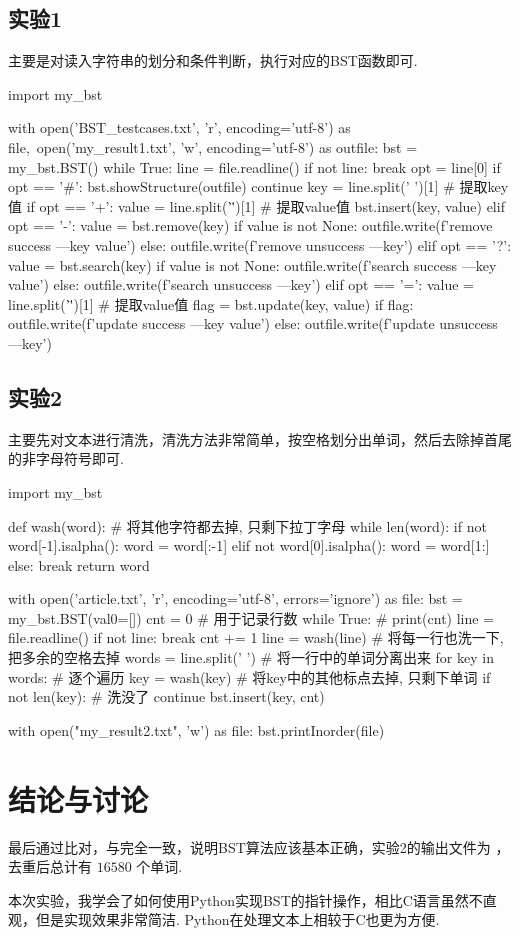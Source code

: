 \documentclass[12pt, a4paper, oneside]{ctexart}
\numberwithin{equation}{section}  %
\begin{document}
\subsection{实验1}
主要是对读入字符串的划分和条件判断，执行对应的BST函数即可.
\begin{pythoncode}
import my_bst

with open('BST_testcases.txt', 'r', encoding='utf-8') as file,\
        open('my_result1.txt', 'w', encoding='utf-8') as outfile:
    bst = my_bst.BST()
    while True:
        line = file.readline()
        if not line:
            break
        opt = line[0]
        if opt == '#':
            bst.showStructure(outfile)
            continue
        key = line.split(' ')[1]  # 提取key值
        if opt == '+':
            value = line.split('\"')[1]  # 提取value值
            bst.insert(key, value)
        elif opt == '-':
            value = bst.remove(key)
            if value is not None:
                outfile.write(f'remove success ---{key} {value}\n')
            else:
                outfile.write(f'remove unsuccess ---{key}\n')
        elif opt == '?':
            value = bst.search(key)
            if value is not None:
                outfile.write(f'search success ---{key} {value}\n')
            else:
                outfile.write(f'search unsuccess ---{key}\n')
        elif opt == '=':
            value = line.split('\"')[1]  # 提取value值
            flag = bst.update(key, value)
            if flag:
                outfile.write(f'update success ---{key} {value}\n')
            else:
                outfile.write(f'update unsuccess ---{key}\n')
\end{pythoncode}
\subsection{实验2}
主要先对文本进行清洗，清洗方法非常简单，按空格划分出单词，然后去除掉首尾的非字母符号即可.
\begin{pythoncode}
import my_bst

def wash(word):  # 将其他字符都去掉, 只剩下拉丁字母
    while len(word):
        if not word[-1].isalpha():
            word = word[:-1]
        elif not word[0].isalpha():
            word = word[1:]
        else:
            break
    return word

with open('article.txt', 'r', encoding='utf-8', errors='ignore') as file:
    bst = my_bst.BST(val0=[])
    cnt = 0  # 用于记录行数
    while True:
        # print(cnt)
        line = file.readline()
        if not line:
            break
        cnt += 1
        line = wash(line)  # 将每一行也洗一下, 把多余的空格去掉
        words = line.split(' ')  # 将一行中的单词分离出来
        for key in words:  # 逐个遍历
            key = wash(key)  # 将key中的其他标点去掉, 只剩下单词
            if not len(key):  # 洗没了
                continue
            bst.insert(key, cnt)

with open("my_result2.txt", 'w') as file:
    bst.printInorder(file)
\end{pythoncode}

\section{结论与讨论}
最后通过比对，与完全一致，说明BST算法应该基本正确，实验2的输出文件为 ，去重后总计有 $16580$ 个单词.

本次实验，我学会了如何使用Python实现BST的指针操作，相比C语言虽然不直观，但是实现效果非常简洁. Python在处理文本上相较于C也更为方便.
\end{document}
